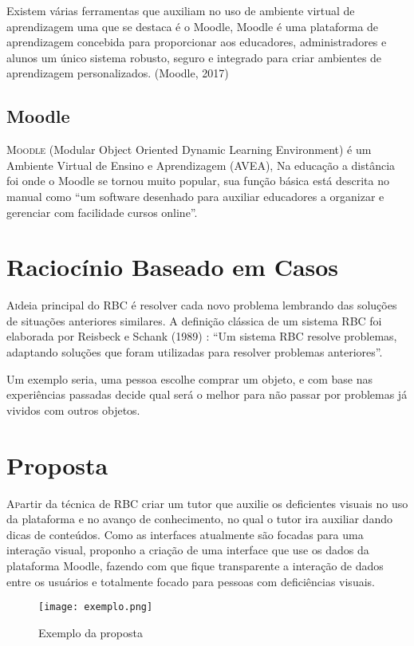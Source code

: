 \documentclass{article}
\begin{document}
Existem várias ferramentas que auxiliam no uso de ambiente virtual de aprendizagem uma que se destaca é o Moodle, Moodle é uma plataforma de aprendizagem concebida para proporcionar aos educadores, administradores e alunos um único sistema robusto, seguro e integrado para criar ambientes de aprendizagem personalizados. (Moodle, 2017) \citep{MoodleOrg}

\subsection{Moodle}
\lettrine{M}{oodle} (Modular Object Oriented Dynamic Learning Environment) é um Ambiente Virtual de Ensino e Aprendizagem (AVEA), Na educação a distância foi onde o Moodle se tornou muito popular, sua função básica está descrita no manual como “um software desenhado para auxiliar educadores a organizar e gerenciar com facilidade cursos online”. 

\section{Raciocínio Baseado em Casos}
\lettrine{A} ideia principal do RBC é resolver cada novo problema lembrando das soluções de situações anteriores similares. A definição clássica de um sistema RBC foi elaborada por Reisbeck e Schank (1989) \citep{Riesbeck}: “Um sistema RBC resolve problemas, adaptando soluções que foram utilizadas para resolver problemas anteriores”.

Um exemplo seria, uma pessoa escolhe comprar um objeto, e com base nas experiências passadas decide qual será o melhor para não passar por problemas já vividos com outros objetos.

\section{Proposta}
\lettrine{A} partir da técnica de RBC criar um tutor que auxilie os deficientes visuais no uso da plataforma e no avanço de conhecimento, no qual o tutor ira auxiliar dando dicas de conteúdos.
Como as interfaces atualmente são focadas para uma interação visual, proponho a criação de uma interface que use os dados da plataforma Moodle, fazendo com que fique transparente a interação de dados entre os usuários e totalmente focado para pessoas com deficiências visuais.

\begin{figure}[h!]
\centering
\texttt{[image: exemplo.png]}
\caption{Exemplo da proposta}
\label{fig:univerise}
\end{figure}
\end{document}
